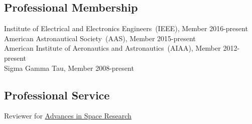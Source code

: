 
\subsection*{Professional Membership}
{}
Institute of Electrical and Electronics Engineers~(IEEE), Member \hfill {2016-present} \\
American Astronautical Society~(AAS), Member \hfill {2015-present} \\
American Institute of Aeronautics and Astronautics~(AIAA), Member \hfill {2012-present} \\
Sigma Gamma Tau, Member \hfill  {2008-present} \\

\subsection*{Professional Service}
Reviewer for \href{http://www.journals.elsevier.com/advances-in-space-research/}{Advances in Space Research}
